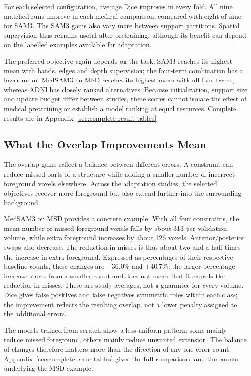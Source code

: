 \documentclass[12pt,a4paper]{article}
\begin{document}
For each selected configuration, average Dice improves in every fold.
All nine matched runs improve in each medical comparison, compared with
eight of nine for SAM3. The SAM3 gains also vary more between support
partitions. Spatial supervision thus remains useful
after pretraining, although its benefit can depend on the labelled
examples available for adaptation.

The preferred objective again depends on the task. SAM3 reaches its
highest mean with bands, edges and depth supervision; the four-term
combination has a lower mean. MedSAM3 on MSD reaches its highest mean
with all four terms, whereas ADNI has closely ranked alternatives.
Because initialization, support size and update budget differ between
studies, these scores cannot isolate the effect of medical pretraining
or establish a model ranking at equal resources. Complete results are
in Appendix~\ref{sec:complete-result-tables}.

\FloatBarrier
\subsection{What the Overlap Improvements Mean}
\label{sec:error-analysis}\label{sec:capped-errors-resources}
\label{sec:background-dice-results}

The overlap gains reflect a balance between different errors. A constraint
can reduce missed parts of a structure while adding a smaller number of
incorrect foreground voxels elsewhere. Across the adaptation studies,
the selected objectives recover more foreground but also extend further
into the surrounding background.

MedSAM3 on MSD provides a concrete example. With all four constraints,
the mean number of missed foreground voxels falls by about 313 per
validation volume, while extra foreground increases by about 126 voxels.
Anterior/posterior swaps also decrease. The reduction in misses is thus
about two and a half times the increase in extra foreground. Expressed
as percentages of their respective baseline counts, these changes are
$-36.0\%$ and $+40.7\%$: the larger percentage increase starts from a
smaller count and does not mean that it cancels the reduction in misses.
These are study averages, not a guarantee for every volume. Dice gives
false positives and false negatives symmetric roles within each class;
the improvement reflects the resulting overlap, not a lower penalty
assigned to the additional errors.

The models trained from scratch show a less uniform pattern: some mainly
reduce missed foreground, others mainly reduce unwanted extension. The
balance of changes therefore matters more than the direction of any
one error count. Appendix~\ref{sec:complete-error-tables} gives the
full comparisons and the counts underlying the MSD example.
\end{document}

